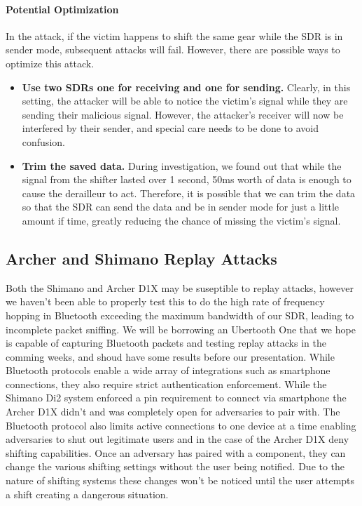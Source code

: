 \documentclass[letterpaper,twocolumn,10pt]{article}
\begin{document}
\paragraph{Potential Optimization}
In the attack, if the victim happens to shift the same gear while the SDR is in sender mode, 
subsequent attacks will fail. However, there are possible ways to optimize this attack.
\begin{itemize}
  \item \textbf{Use two SDRs one for receiving and one for sending.} Clearly, in this setting, the attacker will be able to notice the victim's signal while they are sending their malicious signal. However, the attacker's receiver will now be interfered by their sender, and special care needs to be done to avoid confusion.
  \item \textbf{Trim the saved data.} During investigation, we found out that while the signal from the shifter lasted over 1 second, 50ms worth of data is enough to cause the derailleur to act. Therefore, it is possible that we can trim the data so that the SDR can send the data and be in sender mode for just a little amount if time, greatly reducing the chance of missing the victim's signal.
\end{itemize}


\subsection{Archer and Shimano Replay Attacks}

Both the Shimano and Archer D1X may be suseptible to replay attacks, however we haven't been able to properly test this to do the high rate of frequency hopping in Bluetooth exceeding the maximum bandwidth of our SDR, leading to incomplete packet sniffing. We will be borrowing an Ubertooth One that we hope is capable of capturing Bluetooth packets and testing replay attacks in the comming weeks, and shoud have some results before our presentation.
While Bluetooth protocols enable a wide array of integrations such as smartphone connections, they also require strict authentication enforcement. While the Shimano Di2 system enforced a pin requirement to connect via smartphone the Archer D1X didn’t and was completely open for adversaries to pair with. The Bluetooth protocol also limits active connections to one device at a time enabling adversaries to shut out legitimate users and in the case of the Archer D1X deny shifting capabilities. Once an adversary has paired with a component, they can change the various shifting settings without the user being notified. Due to the nature of shifting systems these changes won’t be noticed until the user attempts a shift creating a dangerous situation.
\end{document}
